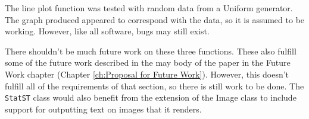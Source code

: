 \documentclass[12pt]{report}
\begin{document}
The line plot function was tested with random data from a Uniform generator.  The graph produced appeared to correspond with the data, so it is assumed to be working.  However, like all software, bugs may still exist.

There shouldn't be much future work on these three functions.  These also fulfill some of the future work described in the may body of the paper in the Future Work chapter (Chapter \ref{ch:Proposal for Future Work}).  However, this doesn't fulfill all of the requirements of that section, so there is still work to be done.  The \texttt{StatST} class would also benefit from the extension of the Image class to include support for outputting text on images that it renders.
\end{document}
